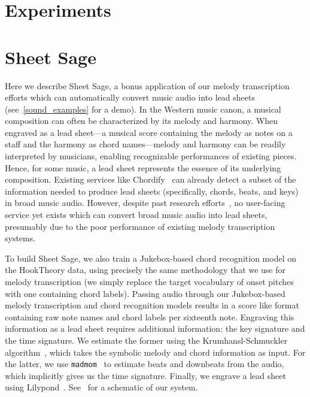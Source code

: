 \documentclass{article}
\newcommand{\madmom}{\texttt{madmom}}
\newcommand{\jukebox}{Jukebox}
\newcommand{\hooktheory}{HookTheory}
\newcommand{\sheetsage}{Sheet Sage}
\begin{document}
\section{Experiments}
\label{sec:experiments}



\section{Sheet Sage}

Here we describe \sheetsage, a bonus application of our melody transcription efforts which can automatically convert music audio into lead sheets (see~\cref{sound_examples} for a demo). 
In the Western music canon, a musical composition can often be characterized by its melody and harmony. 
When engraved as a lead sheet---a musical score containing the melody as notes on a staff and the harmony as chord names---melody and harmony can be readily interpreted by musicians, enabling recognizable performances of existing pieces. 
Hence, for some music, a lead sheet represents the essence of its underlying composition.
Existing services like Chordify~\cite{de2014chordify} can already detect a subset of the information needed to produce lead sheets (specifically, chords, beats, and keys) in broad music audio. 
However, despite past research efforts~\cite{ryynanen2008automatic,weil2009automatic}, no user-facing service yet exists which can convert broad music audio into lead sheets, presumably due to the poor performance of existing melody transcription systems.

To build \sheetsage, we also train a \jukebox-based chord recognition model on the \hooktheory{} data, using precisely the same methodology that we use for melody transcription (we simply replace the target vocabulary of onset pitches with one containing chord labels). 
Passing audio through our \jukebox{}-based melody transcription and chord recognition models results in a score like format containing raw note names and chord labels per sixteenth note. 
Engraving this information as a lead sheet requires additional information: the key signature and the time signature. 
We estimate the former using the Krumhansl-Schmuckler algorithm~\cite{krumhansl1990cognitive,temperley1999key}, which takes the symbolic melody and chord information as input. 
For the latter, we use \madmom~\cite{bock2016madmom,bock2016joint} to estimate beats and downbeats from the audio, which implicitly gives us the time signature.
Finally, we engrave a lead sheet using Lilypond~\cite{nienhuys2003lilypond}. 
See~ for a schematic of our system.
\end{document}
